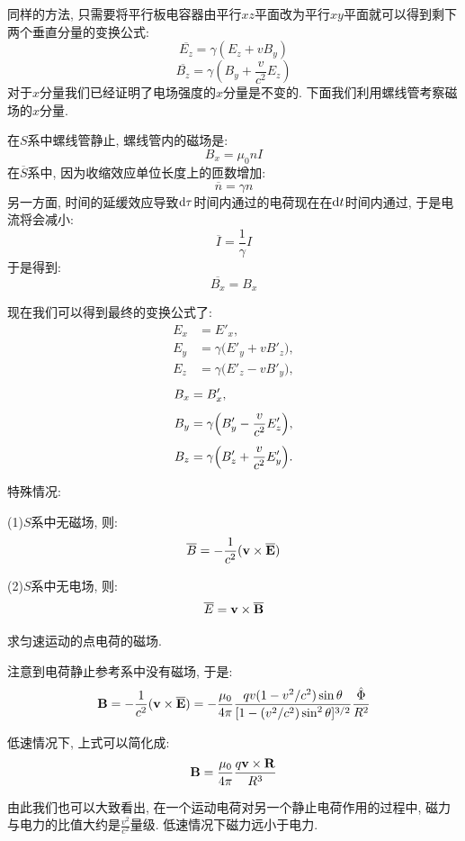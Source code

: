 同样的方法, 只需要将平行板电容器由平行$xz$平面改为平行$xy$平面就可以得到剩下两个垂直分量的变换公式:
\[
\overline{E_z} = \gamma(E_z+vB_y)
\]
\[
\overline{B_z} = \gamma(B_y+\frac{v}{c^2}E_z)
\]
对于$x$分量我们已经证明了电场强度的$x$分量是不变的. 下面我们利用螺线管考察磁场的$x$分量.

在$S$系中螺线管静止, 螺线管内的磁场是:
\[
B_x = \mu_0 nI
\]
在$\overline{S}$系中, 因为收缩效应单位长度上的匝数增加:
\[
\overline{n} = \gamma n
\]
另一方面, 时间的延缓效应导致$\mathop{}\!\mathrm{d} \tau$时间内通过的电荷现在在$\mathop{}\!\mathrm{d} t$时间内通过, 于是电流将会减小:
\[
\overline{I} = \frac{1}{\gamma}I
\]
于是得到:
\[
\overline{B_x} = B_x
\]

现在我们可以得到最终的变换公式了:
\begin{align*}
E_x &= E'_x,\\[4pt]
E_y &= \gamma\bigl(E'_y + v B'_z\bigr),\\[4pt]
E_z &= \gamma\bigl(E'_z - v B'_y\bigr),
\end{align*}
\begin{align*}
B_x &= B'_x,\\[4pt]
B_y &= \gamma\Bigl(B'_y - \frac{v}{c^2}E'_z\Bigr),\\[4pt]
B_z &= \gamma\Bigl(B'_z + \frac{v}{c^2}E'_y\Bigr).
\end{align*}

特殊情况:

(1)$S$系中无磁场, 则:
\[
\overline{B} = -\frac{1}{c^2}(\mathbf{v}\times \overline{\mathbf{E}})
\]

(2)$S$系中无电场, 则:
\[
\overline{E} = \mathbf{v}\times\overline{\mathbf{B}}
\]

\begin{example}
  求匀速运动的点电荷的磁场.

  注意到电荷静止参考系中没有磁场, 于是:
  \[
  \mathbf{B} = -\frac{1}{c^2}(\mathbf{v}\times \overline{\mathbf{E}}) = -\frac{\mu_0}{4\pi}\frac{qv(1-v^2/c^2)\sin\theta}{[1-(v^2/c^2)\sin^2\theta]^{3/2}} \frac{\hat{\Phi}}{R^2}
  \]

  低速情况下, 上式可以简化成:
  \[
  \mathbf{B} = \frac{\mu_0}{4\pi}\frac{q\mathbf{v}\times\mathbf{R}}{R^3}
  \]

  由此我们也可以大致看出, 在一个运动电荷对另一个静止电荷作用的过程中, 磁力与电力的比值大约是$\frac{v^2}{c^2}$量级. 低速情况下磁力远小于电力.
\end{example}
